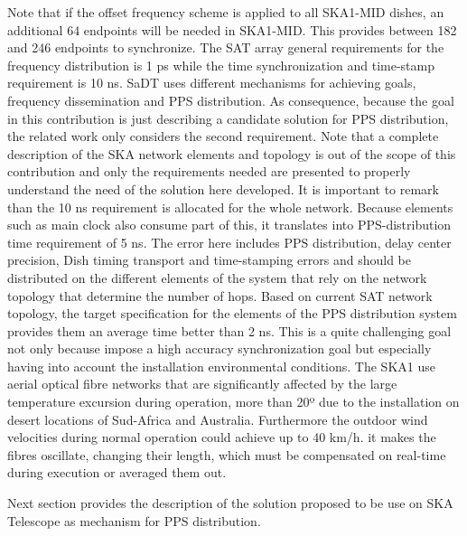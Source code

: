 Note that if the offset frequency scheme is applied to all SKA1-MID dishes, an additional 64 endpoints will be needed in SKA1-MID. This provides between 182 and 246 endpoints to synchronize. 
The SAT array general requirements for the frequency distribution is 1 ps while the time synchronization and time-stamp requirement is 10 ns. SaDT uses different mechanisms for achieving goals, frequency dissemination and PPS distribution. As consequence, because the goal in this contribution is just describing a  candidate solution for PPS distribution, the related work only considers the second requirement. Note that a complete description of the SKA network elements and topology is out of the scope of this contribution and only the requirements needed are presented to properly understand the need of the solution here developed. 
It is important to remark than the 10 ns requirement is allocated for the whole 
network. Because elements such as main clock also consume part of this, it 
translates into PPS-distribution time requirement of 5 ns. The error here 
includes PPS distribution, delay center precision, Dish timing transport and 
time-stamping errors and should be distributed on the different elements of the 
system that rely on the network topology that determine the number of hops. 
Based on current SAT network topology, the target specification for the 
elements of the PPS distribution system provides them an average time better 
than 2 ns. This is a quite challenging goal not only because impose a high 
accuracy synchronization goal but especially having into account the 
installation environmental conditions. The SKA1 use aerial optical fibre 
networks that are significantly affected by the large temperature excursion 
during operation, more than 20º due to the installation on desert locations of 
Sud-Africa and Australia. Furthermore the outdoor wind velocities during normal 
operation could achieve up to 40 km/h. it makes the fibres oscillate, changing 
their length, which must be compensated on real-time during execution or 
averaged them out. 

Next section provides the description of the solution proposed to be use on SKA Telescope as mechanism for PPS distribution. 


